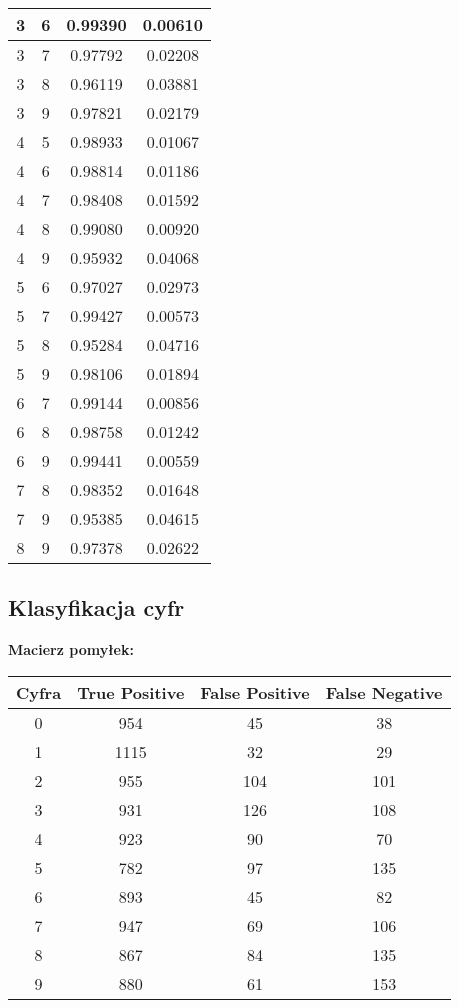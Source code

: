 \documentclass[12pt,a4paper,notitlepage]{article}
\begin{document}
\begin{center}
\begin{tabular}{|c|c|c|c|}
   3 & 6 &  0.99390 & 0.00610\\\hline
   3 & 7 &  0.97792 & 0.02208\\\hline
   3 & 8 &  0.96119 & 0.03881\\\hline
   3 & 9 &  0.97821 & 0.02179\\\hline
   4 & 5 &  0.98933 & 0.01067\\\hline
   4 & 6 &  0.98814 & 0.01186\\\hline
   4 & 7 &  0.98408 & 0.01592\\\hline
   4 & 8 &  0.99080 & 0.00920\\\hline
   4 & 9 &  0.95932 & 0.04068\\\hline
   5 & 6 &  0.97027 & 0.02973\\\hline
   5 & 7 &  0.99427 & 0.00573\\\hline
   5 & 8 &  0.95284 & 0.04716\\\hline
   5 & 9 &  0.98106 & 0.01894\\\hline
   6 & 7 &  0.99144 & 0.00856\\\hline
   6 & 8 &  0.98758 & 0.01242\\\hline
   6 & 9 &  0.99441 & 0.00559\\\hline
   7 & 8 &  0.98352 & 0.01648\\\hline
   7 & 9 &  0.95385 & 0.04615\\\hline
   8 & 9 &  0.97378 & 0.02622\\\hline
\end{tabular}
\end{center}

\subsection{Klasyfikacja cyfr}
\begin{center}
\textbf{Macierz pomyłek:}\\
\begin{tabular}{|c|c|c|c|}
\hline
Cyfra & True Positive & False Positive & False Negative\\\hline
      0  &  954  &   45  &   38\\\hline
      1  & 1115  &   32  &   29\\\hline
      2  &  955  &  104  &  101\\\hline
      3  &  931  &  126  &  108\\\hline
      4  &  923  &   90  &   70\\\hline
      5  &  782  &   97  &  135\\\hline
      6  &  893  &   45  &   82\\\hline
      7  &  947  &   69  &  106\\\hline
      8  &  867  &   84  &  135\\\hline
      9  &  880  &   61  &  153\\\hline
\end{tabular}
\end{center}
\end{document}
